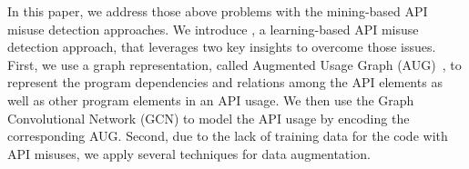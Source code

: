 
In this paper, we address those above problems with the mining-based
API misuse detection approaches. We introduce {\tool}, a
learning-based API misuse detection approach, that leverages two key
insights to overcome those issues. First, we use a graph
representation, called Augmented Usage Graph
(AUG)~\cite{mutetect-msr19}, to represent the program dependencies and
relations among the API elements as well as other program elements in
an API usage. We then use the Graph Convolutional Network (GCN) to
model the API usage by encoding the corresponding AUG. Second, due to
the lack of training data for the code with API misuses, we apply
several techniques for data augmentation.


